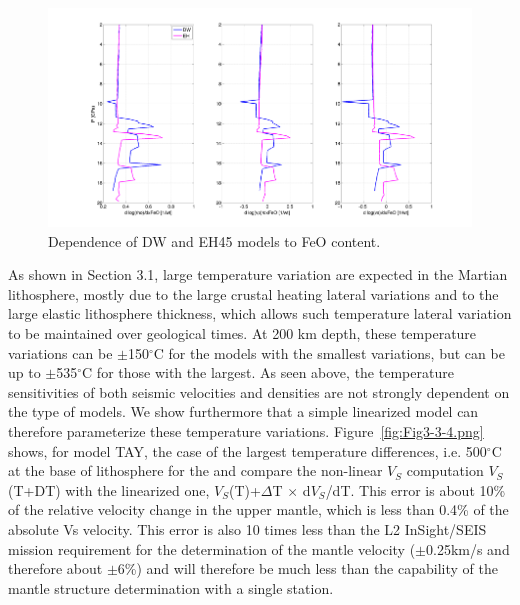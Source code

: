 \begin{figure}[h!]
\begin{center}
\includegraphics[width=1.0\textwidth]
{figures/Fig3-3-3.png}
\caption{Dependence of DW and EH45 models to FeO content.}
\label{fig:Fig3-3-3.png} 
\end{center}
\end{figure}

As shown in Section 3.1, large temperature variation are expected in the Martian lithosphere, mostly due to the large crustal heating lateral variations and to the large elastic lithosphere thickness, which allows such temperature lateral variation to be maintained over geological times. At 200 km depth, these temperature variations can be $\pm$150$^{\circ}$C for the models with the smallest variations, but can be up to $\pm$535$^{\circ}$C for those with the largest.
As seen above, the temperature sensitivities of both seismic velocities and densities are not strongly dependent on the type of models. We show furthermore that a simple linearized model can therefore parameterize these temperature variations. Figure~\ref{fig:Fig3-3-4.png} shows, for model TAY, the case of the largest temperature differences, i.e. 500$^{\circ}$C at the base of lithosphere for the and compare the non-linear $V_S$ computation $V_S$(T+DT) with the linearized one, $V_S$(T)+$\Delta$T $\times$ d$V_S$/dT. This error is about 10\% of the relative velocity change in the upper mantle, which is less than 0.4\% of the absolute Vs velocity. This error is also 10 times less than the L2 InSight/SEIS mission requirement for the determination of the mantle velocity ($\pm$0.25km/s and therefore about $\pm$6\%) and will therefore be much less than the capability of the mantle structure determination with a single station.

